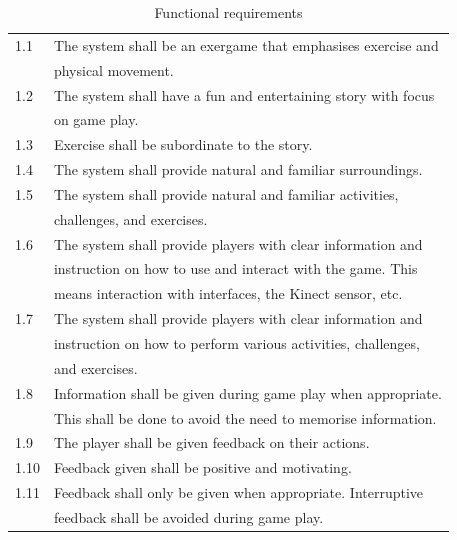 \begin{table} [H]
\label{tab:func1}
\centering
\begin{tabular}{|l|l|}
\hline
1.1 & The system shall be an exergame that emphasises exercise and \\ & physical movement.  \\ \hline
1.2 & The system shall have a fun and entertaining story with focus \\ & on game play.  \\ \hline
1.3 & Exercise shall be subordinate to the story. \\ \hline
1.4 & The system shall provide natural and familiar surroundings. \\ \hline
1.5 & The system shall provide natural and familiar activities, \\ & challenges, and exercises.\\ \hline
1.6 & The system shall provide players with clear information and \\ & instruction on how to use and interact with the game. This \\ & means interaction with interfaces, the Kinect sensor, etc. \\ \hline
1.7 & The system shall provide players with clear information and \\ & instruction on how to perform various activities, challenges,\\ & and exercises. \\ \hline
1.8 & Information shall be given during game play when appropriate. \\ & This shall be done to avoid the need to memorise information. \\ \hline
1.9 & The player shall be given feedback on their actions.\\ \hline
1.10 & Feedback given shall be positive and motivating.\\ \hline
1.11 & Feedback shall only be given when appropriate. Interruptive \\ & feedback shall be avoided during game play. \\ \hline
    \end{tabular}
    \caption[Functional requirements]{Functional requirements}
\end{table} 


